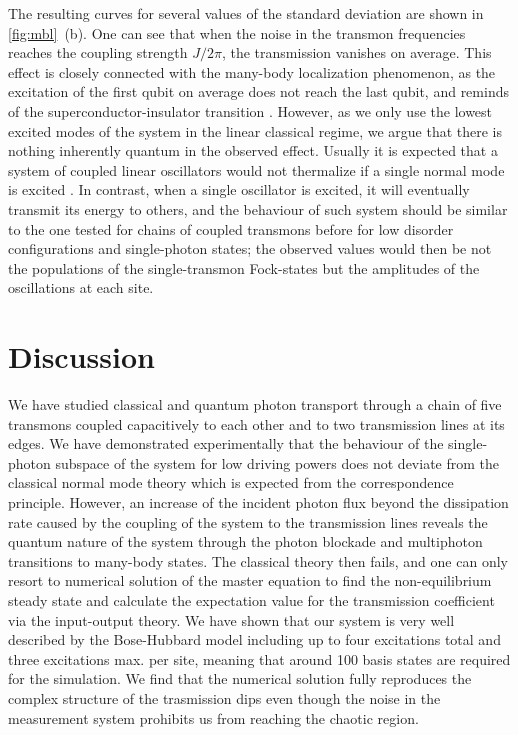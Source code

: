 \documentclass[%
 aps, pra,
 amsmath,amssymb,
 reprint,%
superscriptaddress
]{revtex4-2}
\begin{document}
The resulting curves for several values of the standard deviation are shown in \autoref{fig:mbl}~(b). One can see that when the noise in the transmon frequencies reaches the coupling strength $J/2\pi$, the transmission vanishes on average. This effect is closely connected with the many-body localization phenomenon, as the excitation of the first qubit on average does not reach the last qubit, and reminds of the superconductor-insulator transition \cite{bruder1993superconductor}. However, as we only use the lowest excited modes of the system in the linear classical regime, we argue that there is nothing inherently quantum in the observed effect. Usually it is expected that a system of coupled linear oscillators would not thermalize if a single normal mode is excited \cite{deutsch2018eigenstate}. In contrast, when a single oscillator is excited, it will eventually transmit its energy to others, and the behaviour of such system should be similar to the one tested for chains of coupled transmons before \cite{Yan2019, ma2019dissipatively} for low disorder configurations and single-photon states; the observed values would then be not the populations of the single-transmon Fock-states but the amplitudes of the oscillations at each site.

\section{Discussion}

We have studied classical and quantum photon transport through a chain of five transmons coupled capacitively to each other and to two transmission lines at its edges. We have demonstrated experimentally that the behaviour of the single-photon subspace of the system for low driving powers does not deviate from the classical normal mode theory which is expected from the correspondence principle. However, an increase of the incident photon flux beyond the dissipation rate caused by the coupling of the system to the transmission lines reveals the quantum nature of the system through the photon blockade and multiphoton transitions to many-body states. The classical theory then fails, and one can only resort to numerical solution of the master equation to find the non-equilibrium steady state and calculate the expectation value for the transmission coefficient via the input-output theory. We have shown that our system is very well described by the Bose-Hubbard model including up to four excitations total and three excitations max. per site, meaning that around 100 basis states are required for the simulation. We find that the numerical solution fully reproduces the complex structure of the trasmission dips even though the noise in the measurement system prohibits us from reaching the chaotic region.
\end{document}
